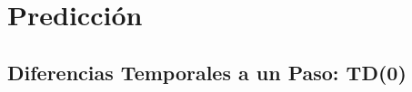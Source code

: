 \documentclass[10pt, envcountsect, handout, aspectratio=1610, hyperref={hypertexnames=true}]{beamer}
\begin{document}

\section{Predicción}




\subsection{Diferencias Temporales a un Paso: TD(0)}



\end{document}
